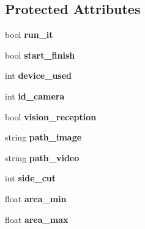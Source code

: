\subsection*{Protected Attributes}
\begin{DoxyCompactItemize}
\item 
bool {\bfseries run\+\_\+it}\hypertarget{classvision_aecb99ce2062a83e281a516779bc38e66}{}\label{classvision_aecb99ce2062a83e281a516779bc38e66}

\item 
bool {\bfseries start\+\_\+finish}\hypertarget{classvision_a4bf6d1ad7886c368201f01d68cd87960}{}\label{classvision_a4bf6d1ad7886c368201f01d68cd87960}

\item 
int {\bfseries device\+\_\+used}\hypertarget{classvision_a4489e26964fedb334f8a11323974d1a5}{}\label{classvision_a4489e26964fedb334f8a11323974d1a5}

\item 
int {\bfseries id\+\_\+camera}\hypertarget{classvision_aed0670889f7380c81cb3c6a9b0783399}{}\label{classvision_aed0670889f7380c81cb3c6a9b0783399}

\item 
bool {\bfseries vision\+\_\+reception}\hypertarget{classvision_a33c98ec05332bc5c29cb59b7aec7cbe9}{}\label{classvision_a33c98ec05332bc5c29cb59b7aec7cbe9}

\item 
string {\bfseries path\+\_\+image}\hypertarget{classvision_a1c8c4864b8690f6146e2d383a0e26f8a}{}\label{classvision_a1c8c4864b8690f6146e2d383a0e26f8a}

\item 
string {\bfseries path\+\_\+video}\hypertarget{classvision_a277365a0346f8f7e8abfcd5dea190706}{}\label{classvision_a277365a0346f8f7e8abfcd5dea190706}

\item 
int {\bfseries side\+\_\+cut}\hypertarget{classvision_ae465726320ce212e6d9ba02c98183a4c}{}\label{classvision_ae465726320ce212e6d9ba02c98183a4c}

\item 
float {\bfseries area\+\_\+min}\hypertarget{classvision_a394274c0683ad061464939b117ef8a34}{}\label{classvision_a394274c0683ad061464939b117ef8a34}

\item 
float {\bfseries area\+\_\+max}\hypertarget{classvision_acd9de3a225e3a560cb0d25546a3dec80}{}\label{classvision_acd9de3a225e3a560cb0d25546a3dec80}


\end{DoxyCompactItemize}
